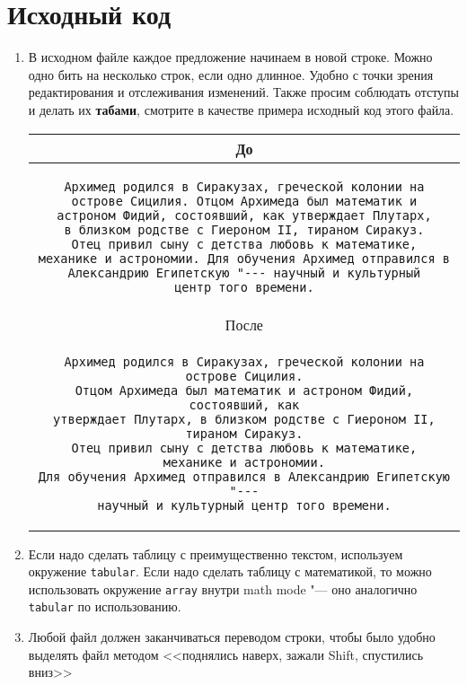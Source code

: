 \section{Исходный код}

\begin{enumerate}
\item
	В исходном файле каждое предложение начинаем в новой строке.
	Можно одно бить на несколько строк, если одно длинное.
	Удобно с точки зрения редактирования и отслеживания изменений.
	Также просим соблюдать отступы и делать их \textbf{табами}, смотрите в качестве примера исходный код этого файла.

	\begin{center}\begin{tabular}{|c|}
	\hline
	До \\
	\hline
	\begin{minipage}{0.9\textwidth}
\begin{verbatim}
Архимед родился в Сиракузах, греческой колонии на
острове Сицилия. Отцом Архимеда был математик и
астроном Фидий, состоявший, как утверждает Плутарх,
в близком родстве с Гиероном II, тираном Сиракуз.
Отец привил сыну с детства любовь к математике,
механике и астрономии. Для обучения Архимед отправился в
Александрию Египетскую "--- научный и культурный
центр того времени.
\end{verbatim}
	\end{minipage}
	\\
	\hline После \\
	\hline
	\begin{minipage}{0.9\textwidth}
\begin{verbatim}
Архимед родился в Сиракузах, греческой колонии на острове Сицилия.
Отцом Архимеда был математик и астроном Фидий, состоявший, как
утверждает Плутарх, в близком родстве с Гиероном II, тираном Сиракуз.
Отец привил сыну с детства любовь к математике,
механике и астрономии.
Для обучения Архимед отправился в Александрию Египетскую "---
научный и культурный центр того времени.
\end{verbatim}
	\end{minipage} \\
	\hline
	\end{tabular}\end{center}

\item
	Если надо сделать таблицу с преимущественно текстом, используем окружение \texttt{tabular}.
	Если надо сделать таблицу с математикой, то можно использовать окружение \texttt{array}
	внутри math mode "--- оно аналогично \texttt{tabular} по использованию.

\item
	Любой файл должен заканчиваться переводом строки, чтобы было удобно выделять файл
	методом <<поднялись наверх, зажали Shift, спустились вниз>>

\end{enumerate}

